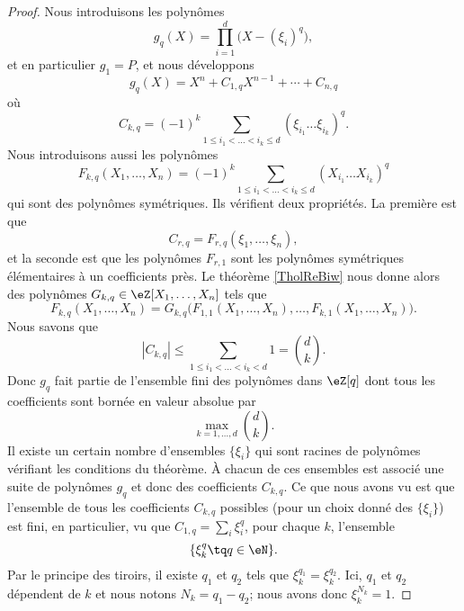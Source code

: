 \begin{proof}
    Nous introduisons les polynômes
    \begin{equation}
        g_q(X)=\prod_{i=1}^d\big( X-(\xi_i)^q \big),
    \end{equation}
    et en particulier \( g_1=P\), et nous développons
    \begin{equation}
        g_q(X)=X^n+C_{1,q}X^{n-1}+\cdots +C_{n,q}
    \end{equation}
    où
    \begin{equation}
        C_{k,q}=(-1)^k\sum_{1\leq i_1<\ldots<i_k\leq d}(\xi_{i_1}\ldots \xi_{i_k})^q.
    \end{equation}
    Nous introduisons aussi les polynômes
    \begin{equation}
        F_{k,q}(X_1,\ldots, X_n)=(-1)^k\sum_{1\leq i_1<\ldots< i_k\leq d}(X_{i_1}\ldots X_{i_k})^q
    \end{equation}
    qui sont des polynômes symétriques. Ils vérifient deux propriétés. La première est que
    \begin{equation}
        C_{r,q}=F_{r,q}(\xi_1,\ldots, \xi_n),
    \end{equation}
    et la seconde est que les polynômes \( F_{r,1}\) sont les polynômes symétriques élémentaires à un coefficients près. Le théorème \ref{TholReBiw} nous donne alors des polynômes \( G_{k,q}\in \eZ[X_1,\ldots, X_n]\) tels que
    \begin{equation}
        F_{k,q}(X_1,\ldots, X_n)=G_{k,q}\big( F_{1,1}(X_1,\ldots, X_n),\ldots, F_{k,1}(X_1,\ldots, X_n) \big).
    \end{equation}
    Nous savons que
    \begin{equation}
        | C_{k,q} |\leq \sum_{1\leq i_1<\ldots<i_k<d}1={d\choose k}.
    \end{equation}
    Donc \( g_q\) fait partie de l'ensemble fini des polynômes dans \( \eZ[q]\) dont tous les coefficients sont bornée en valeur absolue par 
    \begin{equation}
        \max_{k=1,\ldots, d}{d\choose k}.
    \end{equation}
    Il existe un certain nombre d'ensembles \( \{ \xi_i \}\) qui sont racines de polynômes vérifiant les conditions du théorème. À chacun de ces ensembles est associé une suite de polynômes \( g_q\) et donc des coefficients \( C_{k,q}\). Ce que nous avons vu est que l'ensemble de tous les coefficients \( C_{k,q}\) possibles (pour un choix donné des \( \{ \xi_i \}\)) est fini, en particulier, vu que \( C_{1,q}=\sum_i\xi_i^q\), pour chaque \( k\), l'ensemble
    \begin{equation}
        \{ \xi_k^q\tq q\in \eN \}.
    \end{equation}
    Par le principe des tiroirs, il existe \( q_1\) et \( q_2\) tels que \( \xi_k^{q_1}=\xi_k^{q_2}\). Ici, \( q_1\) et \( q_2\) dépendent de \( k\) et nous notons \( N_k=q_1-q_2\); nous avons donc \( \xi_k^{N_k}=1\).


\end{proof}
